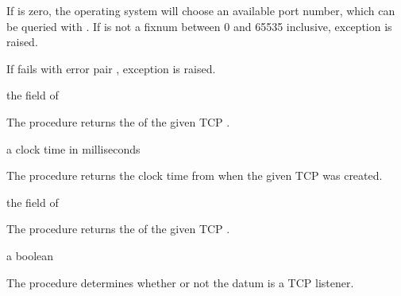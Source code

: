 If  is zero, the operating system will choose an
available port number, which can be queried with
. If  is not a fixnum
between 0 and 65535 inclusive, exception  is raised.

If  fails with error pair , exception  is raised.

\begin{procedure}
\end{procedure}
\returns{} the  field of 

The  procedure returns the  of
the given TCP .

\begin{procedure}
\end{procedure}
\returns{} a clock time in milliseconds

The  procedure returns the clock time from
 when the given TCP  was created.

\begin{procedure}
\end{procedure}
\returns{} the  field of 

The  procedure returns the
 of the given TCP .

\begin{procedure}
\end{procedure}
\returns{} a boolean

The  procedure determines whether or not the datum
 is a TCP listener.

